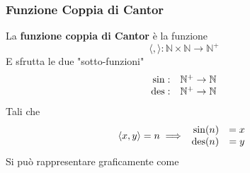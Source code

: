 \subsubsection{Funzione Coppia di Cantor}
La \textbf{funzione coppia di Cantor} è la funzione
$$ \langle , \rangle: \mathbb{N} \times \mathbb{N} \rightarrow \mathbb{N}^+ $$
E sfrutta le due "sotto-funzioni" 
$$
\begin{array}{r c}
	\sin: & \mathbb{N}^+ \rightarrow \mathbb{N} \\
	\operatorname{des}: & \mathbb{N}^+ \rightarrow \mathbb{N}
\end{array}
$$
Tali che 
$$ \langle x,y \rangle = n \implies \begin{array}{r c}
	\sin (n) & = x \\
	\operatorname{des} (n) & = y
\end{array}$$
Si può rappresentare graficamente come

